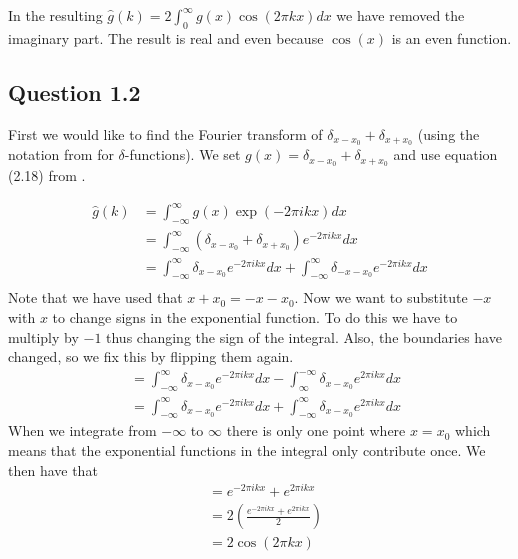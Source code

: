 \documentclass[a4paper, 10pt, final]{article}
\begin{document}
In the resulting $\hat{g}(k) = 2 \int_{0}^{\infty}{g(x)\cos(2\pi kx)dx}$
we have removed the imaginary part. The result is real and even because
$\cos(x)$ is an even function.

\subsection*{Question 1.2}
First we would like to find the Fourier transform of $\delta_{x - x_0} +
\delta_{x + x_0}$ (using the notation from \citeauthor{jahne-digital} for
$\delta$-functions). We set $g(x) = \delta_{x - x_0} + \delta_{x + x_0}$
and use equation (2.18) from \citeauthor{jahne-digital}.

\begin{align*}
    \hat{g}(k) & = \int_{-\infty}^{\infty}{g(x)\exp(-2\pi ikx)dx}\\
    & = \int_{-\infty}^{\infty}{(\delta_{x - x_0} + \delta_{x + x_0})e^{-2\pi ikx}dx}\\
    & = \int_{-\infty}^{\infty}{\delta_{x - x_0}e^{-2\pi ikx}dx +
    \int_{-\infty}^{\infty}{\delta_{-x - x_0}e^{-2\pi ikx}dx}}\\
\end{align*}
Note that we have used that $x + x_0 = -x - x_0$. Now we want to substitute
$-x$ with $x$ to change signs in the exponential function. To do this we
have to multiply by $-1$ thus changing the sign of the integral. Also,
the boundaries have changed, so we fix this by flipping them again.
\begin{align*}
    & = \int_{-\infty}^{\infty}{\delta_{x - x_0}e^{-2\pi ikx}dx - \int_{\infty}^{-\infty}{\delta_{x - x_0}e^{2\pi ikx}dx}}\\
    & = \int_{-\infty}^{\infty}{\delta_{x - x_0}e^{-2\pi ikx}dx + \int_{-\infty}^{\infty}{\delta_{x - x_0}e^{2\pi ikx}dx}}
\end{align*}
When we integrate from $-\infty$ to $\infty$ there is only one point
where $x = x_0$ which means that the exponential functions in the
integral only contribute once. We then have that
\begin{align*}
    & = e^{-2\pi ikx} + e^{2\pi ikx}\\
    & = 2 \left(\frac{e^{-2\pi ikx} + e^{2\pi ikx}}{2}\right)\\
    & = 2 \cos(2\pi kx)
\end{align*}
\end{document}
